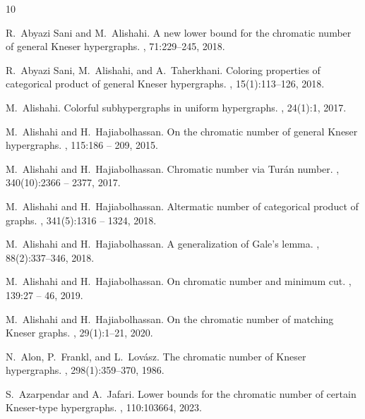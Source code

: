 \documentclass[11pt]{amsart}
\theoremstyle{definition}
\begin{document}
\def\cprime{$'$} \def\cprime{$'$}
\begin{thebibliography}{10}

R.~{Abyazi Sani} and M.~Alishahi.
\newblock A new lower bound for the chromatic number of general {K}neser
  hypergraphs.
, 71:229--245, 2018.

R.~{Abyazi Sani}, M.~Alishahi, and A.~Taherkhani.
\newblock Coloring properties of categorical product of general {K}neser
  hypergraphs.
, 15(1):113--126, 2018.

M.~Alishahi.
\newblock Colorful subhypergraphs in uniform hypergraphs.
, 24(1):1, 2017.

M.~Alishahi and H.~Hajiabolhassan.
\newblock On the chromatic number of general {K}neser hypergraphs.
, 115:186 -- 209,
  2015.

M.~Alishahi and H.~Hajiabolhassan.
\newblock Chromatic number via {T}urán number.
, 340(10):2366 -- 2377, 2017.

M.~Alishahi and H.~Hajiabolhassan.
\newblock Altermatic number of categorical product of graphs.
, 341(5):1316 -- 1324, 2018.

M.~Alishahi and H.~Hajiabolhassan.
\newblock A generalization of {G}ale's lemma.
, 88(2):337--346, 2018.

M.~Alishahi and H.~Hajiabolhassan.
\newblock On chromatic number and minimum cut.
, 139:27 -- 46, 2019.

M.~Alishahi and H.~Hajiabolhassan.
\newblock On the chromatic number of matching {K}neser graphs.
, 29(1):1–21, 2020.

N.~Alon, P.~Frankl, and L.~Lov{\'a}sz.
\newblock The chromatic number of {K}neser hypergraphs.
,
  298(1):359--370, 1986.

S.~Azarpendar and A.~Jafari.
\newblock Lower bounds for the chromatic number of certain {K}neser-type
  hypergraphs.
, 110:103664, 2023.


\end{thebibliography}
\end{document}
